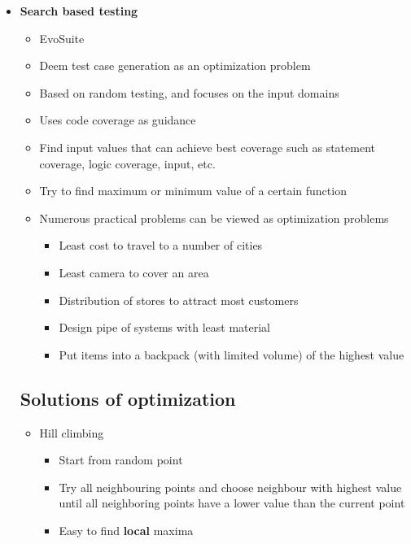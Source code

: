 \documentclass[12pt]{book}
\begin{document}
\begin{itemize}
\begin{itemize}
    \end{itemize}

    \item \textbf{Search based testing}
    \begin{itemize}
        \item EvoSuite
        \item Deem test case generation as an optimization problem
        \item Based on random testing, and focuses on the input domains
        \item Uses code coverage as guidance
        \item Find input values that can achieve best coverage such as statement coverage, logic coverage, input, etc.
        \item Try to find maximum or minimum value of a certain function
        \item Numerous practical problems can be viewed as optimization problems
        \begin{itemize}
            \item Least cost to travel to a number of cities
            \item Least camera to cover an area
            \item Distribution of stores to attract most customers
            \item Design pipe of systems with least material
            \item Put items into a backpack (with limited volume) of the highest value
        \end{itemize}
    \end{itemize}

    \subsection{Solutions of optimization}
    \begin{itemize}
        \item Hill climbing
        \begin{itemize}
            \item Start from random point
            \item Try all neighbouring points and choose neighbour with highest value until all neighboring points have a lower value than the current point
            \item Easy to find \textbf{local} maxima
        \end{itemize} 


\end{itemize}
\end{itemize}
\end{document}
